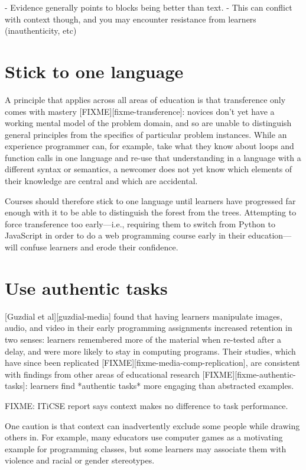 \documentclass{article}
\begin{document}
- Evidence generally points to blocks being better than text.
- This can conflict with context though, and you may encounter resistance from learners (inauthenticity, etc)

\section{Stick to one language}

A principle that applies across all areas of education is that transference only comes with mastery [FIXME][fixme-transference]:
novices don't yet have a working mental model of the problem domain,
and so are unable to distinguish general principles from the specifics of particular problem instances.
While an experience programmer can,
for example,
take what they know about loops and function calls in one language
and re-use that understanding in a language with a different syntax or semantics,
a newcomer does not yet know which elements of their knowledge are central
and which are accidental.

Courses should therefore stick to one language until learners have progressed far enough with it
to be able to distinguish the forest from the trees.
Attempting to force transference too early---i.e.,
requiring them to switch from Python to JavaScript in order to do a web programming course
early in their education---will confuse learners and erode their confidence.

\section{Use authentic tasks}

[Guzdial et al][guzdial-media] found that having learners manipulate images, audio, and video
in their early programming assignments
increased retention in two senses:
learners remembered more of the material when re-tested after a delay,
and were more likely to stay in computing programs.
Their studies,
which have since been replicated [FIXME][fixme-media-comp-replication],
are consistent with findings from other areas of educational research [FIXME][fixme-authentic-tasks]:
learners find *authentic tasks* more engaging than abstracted examples.

FIXME: ITiCSE report says context makes no difference to task performance.

One caution is that context can inadvertently exclude some people while drawing others in.
For example,
many educators use computer games as a motivating example for programming classes,
but some learners may associate them with violence and racial or gender stereotypes.
\end{document}
